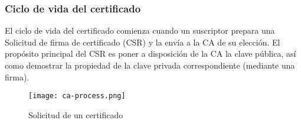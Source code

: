 \subsubsection*{Ciclo de vida del certificado}

El ciclo de vida del certificado comienza cuando un suscriptor prepara una 
Solicitud de firma de certificado (CSR) y la envía a la CA de su elección. 
El propósito principal del CSR es poner a disposición de la CA la clave 
pública, así como demostrar la propiedad de la clave privada correspondiente 
(mediante una firma). 


\begin{center}
    \begin{figure}   
       \begin{center}
          \texttt{[image: ca-process.png]}
       \end{center}
       \caption{Solicitud de un certificado}
       \label{figSolCert}
    \end{figure}
 \end{center}


